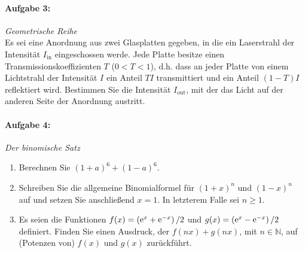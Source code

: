 \paragraph{Aufgabe 3: } \emph{Geometrische Reihe}\\[0.2cm]
Es sei eine Anordnung aus zwei Glasplatten gegeben, in die ein Laserstrahl der Intensität $I_\text{in}$ eingeschossen werde. Jede Platte besitze einen Transmissionskoeffizienten $T$ ($0<T<1$), d.h. dass an jeder Platte von einem Lichtstrahl der Intensität $I$ ein Anteil $T I$ transmittiert und ein Anteil $(1-T)I$ reflektiert wird.
Bestimmen Sie die Intensität $I_\text{out}$, mit der das Licht auf der anderen Seite der Anordnung austritt.\\
\begin{center}
    \vspace{-1cm}
\vspace{-2cm}
\end{center}
%
\newpage
\paragraph{Aufgabe 4: } \emph{Der binomische Satz}
\begin{enumerate}[label=(\alph*)]
\item Berechnen Sie $(1+a)^6+(1-a)^6$.
\item Schreiben Sie die allgemeine Binomialformel für $(1+x)^n$ und $(1-x)^n$ auf und setzen Sie anschließend $x=1$. In letzterem Falle sei $n\ge 1$.
\item Es seien die Funktionen $f(x)=\left(\mathrm{e}^{x}+\mathrm{e}^{-x}\right)/2$ und $g(x)=\left(\mathrm{e}^{x}-\mathrm{e}^{-x}\right)/2$ definiert. Finden Sie einen Ausdruck, der $f(nx)+g(nx)$, mit $n\in\mathbb{N}$, auf (Potenzen von) $f(x)$ und $g(x)$ zurückführt.
\end{enumerate}
%
